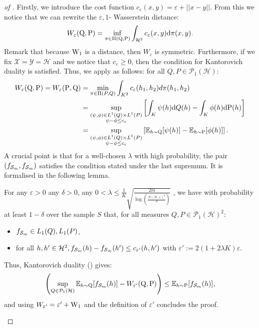 \begin{proof}[of ]
Firstly, we introduce the cost function $c_{\varepsilon}(x,y)= \varepsilon + ||x-y||$.
From this we notice that we can rewrite the $\varepsilon,1$- Wasserstein distance:
\[ W_{\varepsilon}(\mathrm{Q},\mathrm{P})= \inf_{\pi \in \Pi(\mathrm{Q},\mathrm{P})} \int_{\mathcal{H}^2} c_{\varepsilon}(x,y)\mathrm{d}\pi(x,y).  \]
Remark that because $\mathrm{W}_{1}$ is a distance, then $W_\varepsilon$ is symmetric. Furthermore, if we fix $\mathcal{X}=\mathcal{Y}=\mathcal{H}$ and we notice that $c_{\varepsilon}\geq 0$, then the condition for Kantorovich duality is satisfied. Thus, we apply  as follows: for all $Q,P\in \mathcal{P}_1(\mathcal{H})$:
\begin{align*}
W_\varepsilon(\mathrm{Q},\mathrm{P})= W_\varepsilon(\mathrm{P},\mathrm{Q}) & =  \min _{\pi \in \Pi(P, Q)}  \int_{K^2} c_{\varepsilon}(h_1, h_2) d \pi(h_1, h_2)  \\
&=\sup_{\substack{(\psi, \phi) \in L^1(Q) \times L^1(P)\\ \psi-\phi \leq c_{\varepsilon}}}\left[\int_{K} \psi(h) \mathrm{d}Q(h)- \int_{K} \phi(h) \mathrm{d}\mathrm{P}(h)\right] \\
& = \sup_{\substack{(\psi, \phi) \in L^1(Q) \times L^1(P)\\ \psi-\phi \leq c_{\varepsilon}}}\left[\mathbb{E}_{h\sim \mathrm{Q}}[ \psi(h)]- \mathbb{E}_{h\sim \mathrm{P}}[ \phi(h)]\right].
\end{align*}
A crucial point is that for a well-chosen $\lambda$ with high probability, the pair $(f_{\mathcal{S}_m},f_{\mathcal{S}_m})$ satisfies the condition stated under the last supremum. It is formalised in the following lemma.
\begin{lemma}
\label{lem:kk}
For any $\varepsilon>0$ any $\delta>0$, any $0<\lambda\leq \frac{1}{K}\sqrt{\frac{2m}{\log\left(\frac{N(\mathcal{H},\varepsilon)^2}{\delta}\right)}}$ , we have with probability at least $1-\delta$ over the sample $S$ that, for all measures $Q,P\in\mathcal{P}_1(\mathcal{H})^2$:
\begin{itemize}
  \item $f_{\mathcal{S}_m}\in L_1(Q),L_1(P)$,
  \item for all $h,h' \in \mathcal{H}^2, f_{\mathcal{S}_m}(h)-f_{\mathcal{S}_m}(h') \leq c_{\varepsilon'}(h,h')$ with $\varepsilon':= 2(1+2\lambda K) \varepsilon$.
\end{itemize}
Thus, Kantorovich duality () gives:
\[ \left(\sup_{Q\in \mathcal{P}_1(\mathcal{H})} \mathbb{E}_{h\sim \mathrm{Q}}[ f_{\mathcal{S}_m}(h)] -  W_{\varepsilon'}(\mathrm{Q},\mathrm{P}) \right)\leq \mathbb{E}_{h\sim \mathrm{P}}[ f_{\mathcal{S}_m}(h)],    \]
and using $W_{\varepsilon'} = \varepsilon' + \mathrm{W}_{1}$ and the definition of $\varepsilon'$ concludes the proof.

\end{lemma}
\end{proof}
